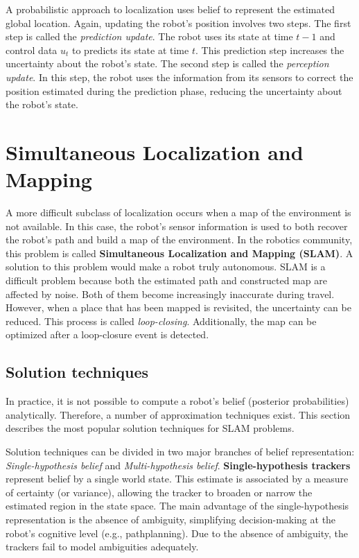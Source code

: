 A probabilistic approach to localization uses belief to represent the estimated global location.
Again, updating the robot's position involves two steps.
The first step is called the \textit{prediction update}.
The robot uses its state at time $t - 1$ and control data $u_t$ to predicts its state at time $t$.
This prediction step increases the uncertainty about the robot's state.
The second step is called the \textit{perception update}.  
In this step, the robot uses the information from its sensors to correct the position estimated during the prediction phase, reducing the uncertainty about the robot's state.

\section{Simultaneous Localization and Mapping}
\label{sec:probabilistic-robotics-slam}

A more difficult subclass of localization occurs when a map of the environment is not available.
In this case, the robot's sensor information is used to both recover the robot's path and build a map of the environment.
In the robotics community, this problem is called \textbf{Simultaneous Localization and Mapping (SLAM)}.
A solution to this problem would make a robot truly autonomous.
SLAM is a difficult problem because both the estimated path and constructed map are affected by noise.
Both of them become increasingly inaccurate during travel.
However, when a place that has been mapped is revisited, the uncertainty can be reduced.
This process is called \textit{loop-closing}.
Additionally, the map can be optimized after a loop-closure event is detected.


\subsection{Solution techniques}
\label{sec:background-solution-techniques}
In practice, it is not possible to compute a robot's belief (posterior probabilities) analytically.
Therefore, a number of approximation techniques exist. 
This section describes the most popular solution techniques for SLAM problems.

Solution techniques can be divided in two major branches of belief representation: \textit{Single-hypothesis belief} and \textit{Multi-hypothesis belief}.
\textbf{Single-hypothesis trackers} represent belief by a single world state.
This estimate is associated by a measure of certainty (or variance), allowing the tracker to broaden or narrow the estimated region in the state space.
The main advantage of the single-hypothesis representation is the absence of ambiguity, simplifying decision-making at the robot's cognitive level (e.g., pathplanning).
Due to the absence of ambiguity, the trackers fail to model ambiguities adequately.

